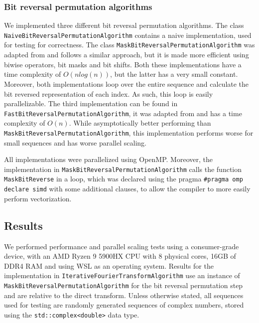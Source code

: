 \subsubsection{Bit reversal permutation algorithms}
We implemented three different bit reversal permutation algorithms. The class \texttt{Naive\-Bit\-Reversal\-Permutation\-Algorithm} contains a naive implementation, used for testing for correctness. The class \texttt{Mask\-Bit\-Reversal\-Permutation\-Algorithm} was adapted from \cite{mask_bit_rev} and follows a similar approach, but it is made more efficient using biwise operators, bit masks and bit shifts. Both these implementations have a time complexity of $O(n log(n))$, but the latter has a very small constant. Moreover, both implementations loop over the entire sequence and calculate the bit reversed representation of each index. As such, this loop is easily parallelizable. The third implementation can be found in \texttt{Fast\-Bit\-Reversal\-Permutation\-Algorithm}, it was adapted from \cite{fast_bit_rev} and has a time complexity of $O(n)$. While asymptotically better performing than \texttt{Mask\-Bit\-Reversal\-Permutation\-Algorithm}, this implementation performs worse for small sequences and has worse parallel scaling. 

All implementations were parallelized using OpenMP. Moreover, the implementation in \texttt{Mask\-Bit\-Reversal\-Permutation\-Algorithm} calls the function \texttt{Mask\-Bit\-Reverse} in a loop, which was declared using the pragma \texttt{\#pragma omp declare simd} with some additional clauses, to allow the compiler to more easily perform vectorization.

\subsection{Results}
We performed performance and parallel scaling tests using a consumer-grade device, with an AMD Ryzen 9 5900HX CPU with 8 physical cores, 16GB of DDR4 RAM and using WSL as an operating system. Results for the implementation in \texttt{Iterative\-Fourier\-Transform\-Algorithm} use an instance of \texttt{Mask\-Bit\-Reversal\-Permutation\-Algorithm} for the bit reversal permutation step and are relative to the direct transform. Unless otherwise stated, all sequences used for testing are randomly generated sequences of complex numbers, stored using the \texttt{std::complex<double>} data type.

